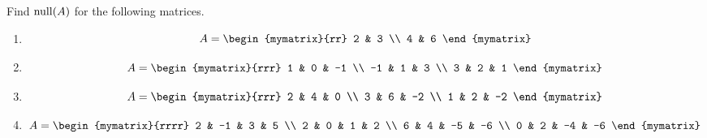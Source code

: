 \begin{ex}
  Find $\nullspace(A)$ for the following matrices.
  \begin{enumerate}
  \item
    \begin{equation*}
      A = \begin{mymatrix}{rr}
        2 & 3 \\
        4 & 6
      \end{mymatrix}
    \end{equation*}
  \item
    \begin{equation*}
      A = \begin{mymatrix}{rrr}
        1 & 0 & -1 \\
        -1 & 1 & 3 \\
        3 & 2 & 1
      \end{mymatrix}
    \end{equation*}
  \item
    \begin{equation*}
      A = \begin{mymatrix}{rrr}
        2 & 4 & 0 \\
        3 & 6 & -2 \\
        1 & 2 & -2
      \end{mymatrix}
    \end{equation*}
  \item
    \begin{equation*}
      A = \begin{mymatrix}{rrrr}
        2 & -1 & 3 & 5 \\
        2 & 0 & 1 & 2 \\
        6 & 4 & -5 & -6 \\
        0 & 2 & -4 & -6
      \end{mymatrix}
    \end{equation*}
  \end{enumerate}
\end{ex}

